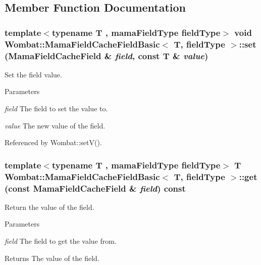 \subsection{Member Function Documentation}
\hypertarget{classWombat_1_1MamaFieldCacheFieldBasic_a50c9816b799e79b30ea437e6bd24357a}{
\subsubsection[{set}]{\setlength{\rightskip}{0pt plus 5cm}template$<$typename T , mamaFieldType fieldType$>$ void {\bf Wombat::MamaFieldCacheFieldBasic}$<$ T, fieldType $>$::set ({\bf MamaFieldCacheField} \& {\em field}, \/  const T \& {\em value})}}
\label{classWombat_1_1MamaFieldCacheFieldBasic_a50c9816b799e79b30ea437e6bd24357a}


Set the field value. 
\begin{DoxyParams}{Parameters}
\item[{\em field}]The field to set the value to. \item[{\em value}]The new value of the field. \end{DoxyParams}


Referenced by Wombat::setV().\hypertarget{classWombat_1_1MamaFieldCacheFieldBasic_a054d236ef9827c2b3278fb8b19bfde17}{
\subsubsection[{get}]{\setlength{\rightskip}{0pt plus 5cm}template$<$typename T , mamaFieldType fieldType$>$ T {\bf Wombat::MamaFieldCacheFieldBasic}$<$ T, fieldType $>$::get (const {\bf MamaFieldCacheField} \& {\em field}) const}}
\label{classWombat_1_1MamaFieldCacheFieldBasic_a054d236ef9827c2b3278fb8b19bfde17}


Return the value of the field. 
\begin{DoxyParams}{Parameters}
\item[{\em field}]The field to get the value from. \end{DoxyParams}
\begin{DoxyReturn}{Returns}
The value of the field. 
\end{DoxyReturn}



